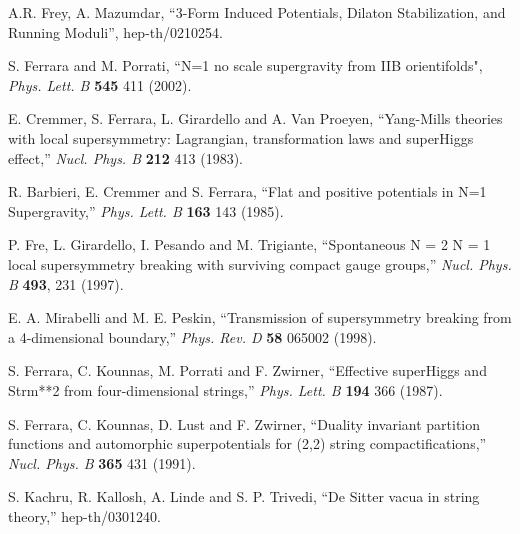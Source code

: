 \documentclass[a4paper,12pt]{article}
\begin{document}
\begin{thebibliography}{99}
A.R. Frey, A. Mazumdar, ``3-Form Induced Potentials, Dilaton
Stabilization, and Running Moduli'', hep-th/0210254.

 S. Ferrara and M. Porrati, ``N=1 no scale
supergravity from IIB orientifolds", {\it Phys. Lett. B} {\bf 545}
411 (2002).

E. Cremmer, S. Ferrara, L. Girardello and A. Van Proeyen,
``Yang-Mills theories with local supersymmetry: Lagrangian,
transformation laws and superHiggs effect,'' {\it Nucl. Phys. B}
{\bf 212} 413 (1983).

 R. Barbieri, E. Cremmer and S. Ferrara,
``Flat and positive potentials in N=1 Supergravity,'' {\it Phys.
Lett. B} {\bf 163} 143 (1985).

P. Fre, L. Girardello, I. Pesando and M. Trigiante,
``Spontaneous N = 2 \myHighlight{$\to$}\coordHE{} N = 1 local supersymmetry breaking with
surviving  compact gauge groups,'' {\it Nucl.  Phys.  B} {\bf
493}, 231 (1997).

E. A. Mirabelli and M. E. Peskin, ``Transmission of supersymmetry
breaking from a 4-dimensional boundary,'' {\it Phys. Rev. D} {\bf
58} 065002 (1998).


S. Ferrara, C. Kounnas, M. Porrati and F. Zwirner, ``Effective
superHiggs and Strm**2 from four-dimensional strings,'' {\it Phys.
Lett. B} {\bf 194} 366 (1987).



S. Ferrara, C. Kounnas, D. Lust and F. Zwirner, ``Duality
invariant partition functions and automorphic superpotentials for
(2,2) string compactifications,'' {\it Nucl.  Phys.  B} {\bf 365}
431 (1991).

S. Kachru, R. Kallosh, A. Linde and S. P. Trivedi, ``De Sitter
vacua in string theory,'' hep-th/0301240.



















\end{thebibliography}
\end{document}
